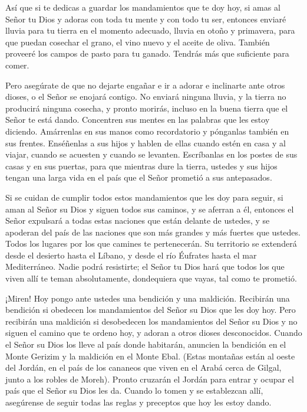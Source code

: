  Así que si te dedicas a guardar los mandamientos que te
doy hoy, si amas al Señor tu Dios y adoras con toda tu mente y con todo
tu ser,  entonces enviaré lluvia para tu tierra en el
momento adecuado, lluvia en otoño y primavera, para que puedan cosechar
el grano, el vino nuevo y el aceite de oliva.  También
proveeré los campos de pasto para tu ganado. Tendrás más que suficiente
para comer.

 Pero asegúrate de que no dejarte engañar e ir a adorar e
inclinarte ante otros dioses,  o el Señor se enojará
contigo. No enviará ninguna lluvia, y la tierra no producirá ninguna
cosecha, y pronto morirás, incluso en la buena tierra que el Señor te
está dando.  Concentren sus mentes en las palabras que les
estoy diciendo. Amárrenlas en sus manos como recordatorio y pónganlas
también en sus frentes.  Enséñenlas a sus hijos y hablen de
ellas cuando estén en casa y al viajar, cuando se acuesten y cuando se
levanten.  Escríbanlas en los postes de sus casas y en sus
puertas,  para que mientras dure la tierra, ustedes y sus
hijos tengan una larga vida en el país que el Señor prometió a sus
antepasados.

 Si se cuidan de cumplir todos estos mandamientos que les
doy para seguir, si aman al Señor su Dios y siguen todos sus caminos, y
se aferran a él,  entonces el Señor expulsará a todas estas
naciones que están delante de ustedes, y se apoderan del país de las
naciones que son más grandes y más fuertes que ustedes. 
Todos los lugares por los que camines te pertenecerán. Su territorio se
extenderá desde el desierto hasta el Líbano, y desde el río Éufrates
hasta el mar Mediterráneo.  Nadie podrá resistirte; el
Señor tu Dios hará que todos los que viven allí te teman absolutamente,
dondequiera que vayas, tal como te prometió.

 ¡Miren! Hoy pongo ante ustedes una bendición y una
maldición.  Recibirán una bendición si obedecen los
mandamientos del Señor su Dios que les doy hoy.  Pero
recibirán una maldición si desobedecen los mandamientos del Señor su
Dios y no siguen el camino que te ordeno hoy, y adoran a otros dioses
desconocidos.  Cuando el Señor su Dios los lleve al país
donde habitarán, anuncien la bendición en el Monte Gerizim y la
maldición en el Monte Ebal.  (Estas montañas están al oeste
del Jordán, en el país de los cananeos que viven en el Arabá cerca de
Gilgal, junto a los robles de Moreh).  Pronto cruzarán el
Jordán para entrar y ocupar el país que el Señor su Dios les da. Cuando
lo tomen y se establezcan allí,  asegúrense de seguir todas
las reglas y preceptos que hoy les estoy dando.

